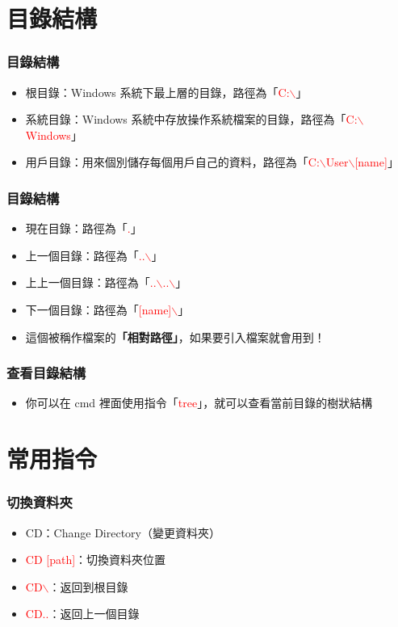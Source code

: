 \documentclass[mathserif]{beamer}
\begin{document}
\section{目錄結構}

\begin{frame}
    \frametitle{目錄結構}
    \begin{itemize}
        \item 根目錄：Windows 系統下最上層的目錄，路徑為「\textcolor{red}{C:$\backslash$}」
        \item 系統目錄：Windows 系統中存放操作系統檔案的目錄，路徑為「\textcolor{red}{C:$\backslash$Windows}」
        \item 用戶目錄：用來個別儲存每個用戶自己的資料，路徑為「\textcolor{red}{C:$\backslash$User$\backslash$[name]}」
    \end{itemize}
\end{frame}

\begin{frame}
    \frametitle{目錄結構}
    \begin{itemize}
        \item 現在目錄：路徑為「\textcolor{red}{.}」
        \item 上一個目錄：路徑為「\textcolor{red}{..$\backslash$}」
        \item 上上一個目錄：路徑為「\textcolor{red}{..$\backslash$..$\backslash$}」
        \item 下一個目錄：路徑為「\textcolor{red}{[name]$\backslash$}」
        \vspace{0.5cm}
        \item 這個被稱作檔案的\textbf{「相對路徑」}，如果要引入檔案就會用到！
    \end{itemize}
\end{frame}

\begin{frame}
    \frametitle{查看目錄結構}
    \begin{itemize}
        \item 你可以在 cmd 裡面使用指令「\textcolor{red}{tree}」，就可以查看當前目錄的樹狀結構
    \end{itemize}
\end{frame}

\section{常用指令}

\begin{frame}
    \frametitle{切換資料夾}
    \begin{itemize}
        \item CD：Change Directory（變更資料夾）
        \vspace{0.5cm}
        \item<2-> \textcolor{red}{CD [path]}：切換資料夾位置
        \item<2-> \textcolor{red}{CD$\backslash$}：返回到根目錄
        \item<2-> \textcolor{red}{CD..}：返回上一個目錄
    \end{itemize}
\end{frame}
\end{document}
